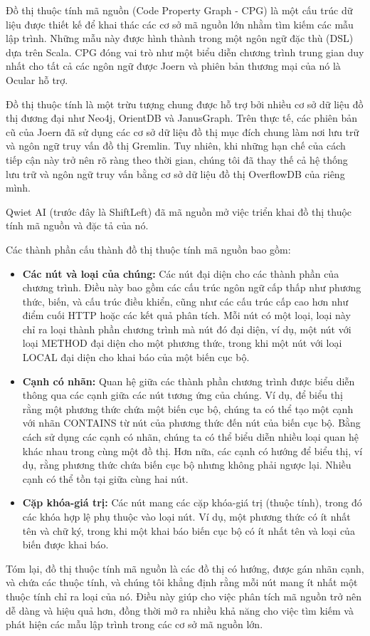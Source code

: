 Đồ thị thuộc tính mã nguồn (Code Property Graph - CPG) là một cấu trúc dữ liệu được thiết kế để khai thác các cơ sở mã nguồn lớn nhằm tìm kiếm các mẫu lập trình. Những mẫu này được hình thành trong một ngôn ngữ đặc thù (DSL) dựa trên Scala. CPG đóng vai trò như một biểu diễn chương trình trung gian duy nhất cho tất cả các ngôn ngữ được Joern và phiên bản thương mại của nó là Ocular hỗ trợ.

Đồ thị thuộc tính là một trừu tượng chung được hỗ trợ bởi nhiều cơ sở dữ liệu đồ thị đương đại như Neo4j, OrientDB và JanusGraph. Trên thực tế, các phiên bản cũ của Joern đã sử dụng các cơ sở dữ liệu đồ thị mục đích chung làm nơi lưu trữ và ngôn ngữ truy vấn đồ thị Gremlin. Tuy nhiên, khi những hạn chế của cách tiếp cận này trở nên rõ ràng theo thời gian, chúng tôi đã thay thế cả hệ thống lưu trữ và ngôn ngữ truy vấn bằng cơ sở dữ liệu đồ thị OverflowDB của riêng mình.

Qwiet AI (trước đây là ShiftLeft) đã mã nguồn mở việc triển khai đồ thị thuộc tính mã nguồn và đặc tả của nó.

Các thành phần cấu thành đồ thị thuộc tính mã nguồn bao gồm:
\begin{itemize}
  \item \textbf{Các nút và loại của chúng:} Các nút đại diện cho các thành phần của chương trình. Điều này bao gồm các cấu trúc ngôn ngữ cấp thấp như phương thức, biến, và cấu trúc điều khiển, cũng như các cấu trúc cấp cao hơn như điểm cuối HTTP hoặc các kết quả phân tích. Mỗi nút có một loại, loại này chỉ ra loại thành phần chương trình mà nút đó đại diện, ví dụ, một nút với loại METHOD đại diện cho một phương thức, trong khi một nút với loại LOCAL đại diện cho khai báo của một biến cục bộ.
  \item \textbf{Cạnh có nhãn:} Quan hệ giữa các thành phần chương trình được biểu diễn thông qua các cạnh giữa các nút tương ứng của chúng. Ví dụ, để biểu thị rằng một phương thức chứa một biến cục bộ, chúng ta có thể tạo một cạnh với nhãn CONTAINS từ nút của phương thức đến nút của biến cục bộ. Bằng cách sử dụng các cạnh có nhãn, chúng ta có thể biểu diễn nhiều loại quan hệ khác nhau trong cùng một đồ thị. Hơn nữa, các cạnh có hướng để biểu thị, ví dụ, rằng phương thức chứa biến cục bộ nhưng không phải ngược lại. Nhiều cạnh có thể tồn tại giữa cùng hai nút.
  \item \textbf{Cặp khóa-giá trị:} Các nút mang các cặp khóa-giá trị (thuộc tính), trong đó các khóa hợp lệ phụ thuộc vào loại nút. Ví dụ, một phương thức có ít nhất tên và chữ ký, trong khi một khai báo biến cục bộ có ít nhất tên và loại của biến được khai báo.
\end{itemize}

Tóm lại, đồ thị thuộc tính mã nguồn là các đồ thị có hướng, được gán nhãn cạnh, và chứa các thuộc tính, và chúng tôi khẳng định rằng mỗi nút mang ít nhất một thuộc tính chỉ ra loại của nó. Điều này giúp cho việc phân tích mã nguồn trở nên dễ dàng và hiệu quả hơn, đồng thời mở ra nhiều khả năng cho việc tìm kiếm và phát hiện các mẫu lập trình trong các cơ sở mã nguồn lớn.
